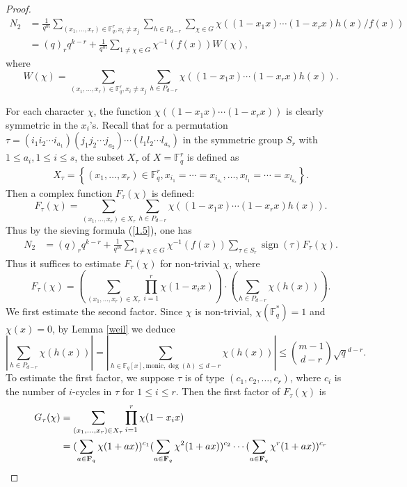 \documentclass[reqno]{amsart}
\theoremstyle{remark}
\numberwithin{equation}{section}
\DeclareMathOperator{\sign}{sign}
\newcommand{\f}{\mathbb{F}_q}
\begin{document}
 \begin{proof}
 \begin{align*}
N_2&=\frac 1 {q^m}\sum_{(x_1,  \dots, x_r)\in \f^r, x_i \ne x_j}\sum_{h\in P_{d-r}}\sum_{\chi\in G }\chi( {(1-x_1x)\cdots(1-x_r x)h(x)}/{f(x)})\\
&=(q)_r{q^{k-r}}+\frac {1} {q^m}\sum_{1\ne \chi\in G }\chi^{-1}(f(x))W(\chi),
 \end{align*}
where $$W(\chi)=\sum_{(x_1,  \dots, x_r)\in \f^r, x_i \ne x_j}\sum_{h\in P_{d-r}}\chi( {(1-x_1x)\cdots(1-x_r x)h(x)}).$$

For each character $\chi$, the function $\chi((1-x_1x)\cdots(1-x_r x))$ is clearly symmetric in the $x_i$'s.
Recall that for a permutation $\tau=(i_1i_2\cdots i_{a_1})
  (j_1j_2\cdots j_{a_2})\cdots(l_1l_2\cdots l_{a_s})$  in the symmetric group $S_r$ with $1\leq a_i, 1 \leq i\leq s$,
  the subset $X_{\tau}$ of $X= \f^r$ is defined as
  \begin{align}
     X_{\tau}=\left\{
(x_1,\dots,x_r)\in \f^r,
 x_{i_1}=\cdots=x_{i_{a_1}},\ldots, x_{l_1}=\cdots=x_{l_{a_s}}
 \right\}.
\end{align}
Then a complex function $F_{\tau}(\chi)$ is defined:
$$F_{\tau}(\chi)=\sum_{(x_1,\ldots, x_r) \in X_{\tau} } \sum_{h\in P_{d-r}}\chi( {(1-x_1x)\cdots(1-x_r x)h(x)}).$$
Thus by the sieving formula (\ref{1.5}), one has
  \begin{align*}
N_2&={(q)_r q^{k-r}} +\frac {1} {q^m}\sum_{1\ne \chi\in G }\chi^{-1}(f(x))\sum_{\tau\in S_r}{\sign(\tau)F_{\tau}(\chi)}.
 \end{align*}
  Thus it suffices to estimate $F_{\tau}(\chi)$ for non-trivial $\chi$, where
$$
   F_{\tau}(\chi)=\left(\sum_{(x_1,\ldots, x_r) \in X_{\tau}} \prod_{i=1}^r\chi(1-x_ix)\right)\cdot \left(\sum_{h\in P_{d-r}}\chi(h(x))\right).
$$
We first estimate the second factor. Since $\chi$ is non-trivial, $\chi(\f^*)=1$ and $\chi(x)=0$, by Lemma \ref{weil}
we deduce
$$|\sum_{h\in P_{d-r}}\chi(h(x))| = |\sum_{h\in\f[x], \text{monic}, \deg(h)\leq d-r} \chi(h(x))| \leq {m-1\choose d-r}\sqrt{q}^{d-r}.$$
To estimate the first factor, we suppose $\tau$ is of type $(c_1,c_2,\ldots,c_{r})$, where $c_i$ is the number of $i$-cycles in $\tau$ for $1 \leq i\leq r$. Then the first
factor of $F_{\tau}(\chi)$ is
   \begin{align*}
G_{\tau}(\chi)&=\sum_{(x_1,\ldots, x_r) \in X_{\tau}} \prod_{i=1}^r\chi(1-x_ix)\\
&=(\sum_{a\in{{\bf{F}}_q}}\chi(1+ax))^{c_1}
(\sum_{a\in{{\bf{F}}_q}}\chi^2(1+ax))^{c_2} \cdots
(\sum_{a\in{{\bf{F}}_q}}\chi^{r}(1+ax))^{c_{r}}\\

\end{align*}
\end{proof}
\end{document}

